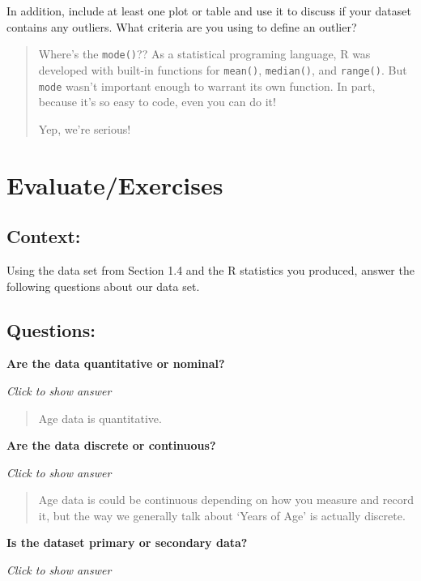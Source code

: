 \documentclass[
]{book}
\begin{document}
In addition, include at least one plot or table and use it to discuss if your dataset contains any outliers. What criteria are you using to define an outlier?

\begin{quote}
Where's the \texttt{mode()}?? As a statistical programing language, R was developed with
built-in functions for \texttt{mean()}, \texttt{median()}, and \texttt{range()}. But \texttt{mode} wasn't important
enough to warrant its own function. In part, because it's so easy to code, even you
can do it!

Yep, we're serious!
\end{quote}

\hypertarget{evaluateexercises}{%
\section{Evaluate/Exercises}\label{evaluateexercises}}

\hypertarget{context}{%
\subsection{Context:}\label{context}}

Using the data set from Section 1.4 and the R statistics you produced,
answer the following questions about our data set.

\hypertarget{questions}{%
\subsection{Questions:}\label{questions}}

\textbf{Are the data quantitative or nominal?}

\emph{Click to show answer}

\begin{quote}
Age data is quantitative.
\end{quote}

\textbf{Are the data discrete or continuous?}

\emph{Click to show answer}

\begin{quote}
Age data is could be continuous depending on how you measure and record it,
but the way we generally talk about `Years of Age' is actually discrete.
\end{quote}

\textbf{Is the dataset primary or secondary data?}

\emph{Click to show answer}
\end{document}
